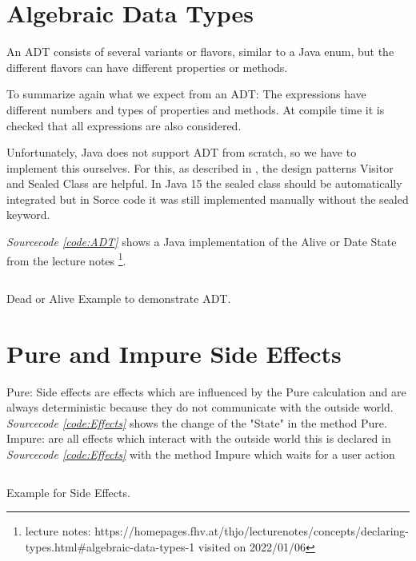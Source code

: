 \documentclass[a4paper,12pt,twoside]{scrreprt}
\begin{document}
\section{Algebraic Data Types}
An \ac{ADT} consists of several variants or flavors, similar to a Java enum, but the different flavors can have different properties or methods.

To summarize again what we expect from an \ac{ADT}:
The expressions have different numbers and types of properties and methods.
At compile time it is checked that all expressions are also considered.

Unfortunately, Java does not support ADT from scratch, so we have to implement this ourselves. For this, as described in \cite{MAINIERO_algebraic_2020}, the design patterns Visitor and Sealed Class are helpful. In Java 15 the sealed class should be automatically integrated but in Sorce code it was still implemented manually without the sealed keyword.

\emph{Sourcecode \ref{code:ADT}} shows a Java implementation of the Alive or Date State from the lecture notes \footnote{ lecture notes: https://homepages.fhv.at/thjo/lecturenotes/concepts/declaring-types.html\#algebraic-data-types-1 visited on 2022/01/06}.
\begin{listing}[ht]
    \inputminted[fontsize=\footnotesize,linenos]{java}{./code/ADT.java}
    \caption[Example for a \ac{ADT}]{Dead or Alive Example to demonstrate \ac{ADT}.}
    \label{code:ADT}
\end{listing}
\clearpage


\section{Pure and Impure Side Effects}
Pure: Side effects are effects which are influenced by the Pure calculation and are always deterministic because they do not communicate with the outside world. \emph{Sourcecode \ref{code:Effects}} shows the change of the "State" in the method Pure.
\newline
Impure: are all effects which interact with the outside world this is declared in \emph{Sourcecode \ref{code:Effects}} with the method Impure which waits for a user action
\begin{listing}[ht]
    \inputminted[fontsize=\footnotesize,linenos]{java}{./code/SideEffects.java}
    \caption[Example for Side Effects]{Example for Side Effects.}
    \label{code:Effects}
\end{listing}
\clearpage

\clearpage
{}
{}
\printbibliography
\end{document}
